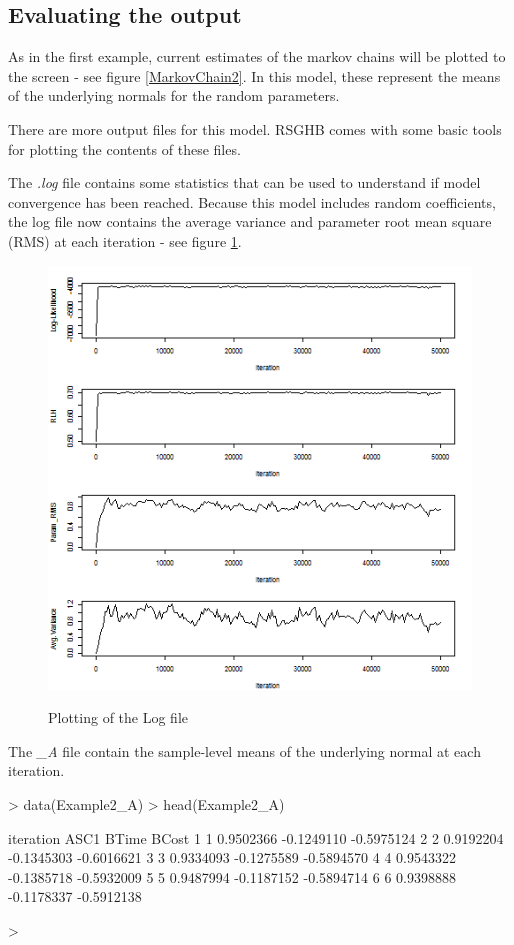 \documentclass{article}
\begin{document}
\subsection*{Evaluating the output}

As in the first example, current estimates of the markov chains will be plotted to the screen - see figure \ref{MarkovChain2}. In this model, these represent the means of the underlying normals for the random parameters.

There are more output files for this model. RSGHB comes with some basic tools for plotting the contents of these files.

The \emph{.log} file contains some statistics that can be used to understand if model convergence has been reached. Because this model includes random coefficients, the log file now contains the average variance and parameter root mean square (RMS) at each iteration - see figure \ref{logfile2}. 

\begin{figure}
\caption{Plotting of the Log file}
\includegraphics[scale=0.50]{MNL_logPlot2.png}
\label{logfile2}
\end{figure}

The \emph{\_A} file contain the sample-level means of the underlying normal at each iteration.

\begin{Schunk}
\begin{Sinput}
> data(Example2_A)
> head(Example2_A)
\end{Sinput}
\begin{Soutput}
  iteration      ASC1      BTime      BCost
1         1 0.9502366 -0.1249110 -0.5975124
2         2 0.9192204 -0.1345303 -0.6016621
3         3 0.9334093 -0.1275589 -0.5894570
4         4 0.9543322 -0.1385718 -0.5932009
5         5 0.9487994 -0.1187152 -0.5894714
6         6 0.9398888 -0.1178337 -0.5912138
\end{Soutput}
\begin{Sinput}
> 
\end{Sinput}
\end{Schunk}
\end{document}
